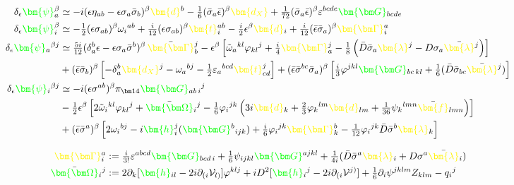 \documentclass[letter,12pt]{article} %
\def\physical#1{ {\color{green} {\bm {#1}} } }
\def\auxiliary#1{ {\color{yellow} {\bm {#1}} } }
\def\grinoXX{ \physical{\psi} }
\def\grinoXY{ \physical{\psi} }
\def\grinoYX{ \physical{\psi} }
\def\grinoYY{ \physical{\psi} }
\def\d{ \auxiliary{d_X} }
\def\dX{ \auxiliary{d} }
\def\dY{ \auxiliary{d} }
\def\dYY{ \auxiliary{d} }
\def\f{\auxiliary{f} }
\def\l{ \auxiliary{\lambda} }
\def\t{ \auxiliary{t} }
\def\X{X}
\def\T{T}
\def\gravitonYY{\physical{h} }
\def\Ga{\auxiliary{\bm \Gamma}}
\def\Oh{\physical{ {\bm \Omega} }}
\def\G{ \physical{ {\bm G} } }
\begin{document}
{%
\begin{align}
\delta_\epsilon \grinoXX_a^\beta &\simeq
	-i  (\epsilon \eta_{ab} - \epsilon \sigma_a \bar \sigma_b)^\beta \dX^b
	-\tfrac 16 (\bar \sigma_a \bar \epsilon)^{\beta} \d
	+\tfrac 1{72} (\bar \sigma_a \bar \epsilon)^{\beta} \varepsilon^{bcde} \G_{bcde}
\cr	
\delta_\epsilon \grinoYX_i^\beta &\simeq
	-\tfrac12 (\epsilon \sigma_{ab})^\beta \omega_i{}^{ab}
	+\tfrac i{12} (\epsilon \sigma_{ab})^\beta \t_i^{ab}
	-\tfrac i2 \epsilon^\beta \dX_i  
	+ \tfrac i{12} (\bar \epsilon \bar \sigma_a )^\beta \Ga_i^{a}
\cr
\delta_\epsilon \grinoXY_{a}{}^{\beta j} 
	&\simeq 
	\tfrac{5i}{12} (\delta_a^b\epsilon 
		- \epsilon \sigma_a \bar \sigma^b)^\beta\,  \bar \Ga_b^j
	- \epsilon^\beta \left[
		\tilde \omega_a{}^{kl}\varphi_{kl}{}^j 
		+\tfrac i4 \Ga^j_a
		-\tfrac18\left(
			\bar D\bar \sigma_a \l^j - D\sigma_a \bar \l^j 
		\right) 
	\right]
	\cr
	& + (\bar \epsilon \bar \sigma_b)^\beta \left[ 
		- \delta_a^b \d^j - \omega_a{}^{bj} 
		-\tfrac12 \varepsilon_a{}^{bcd} \t^j_{cd}
		\right]
	+ (\bar \epsilon \bar \sigma^{bc}\bar \sigma_a)^\beta \left[ 
		\tfrac i3 \varphi^{jkl} \G_{bc\, kl} 
		+\tfrac16 (\bar D \bar \sigma_{bc} \bar\l^j)
		\right]		
\cr
\delta_\epsilon \grinoYY_{i}{}^{\beta j} 
	&\simeq
	-i(\epsilon \sigma^{ab})^\beta \pi_{\bm 14} \G_{ab\,i}{}^j
	\cr
	&-\tfrac 12 \epsilon^\beta \left[
		2\tilde \omega_i{}^{kl}\varphi_{kl}{}^j
		+\bar \Oh_i{}^j
		-\tfrac16 \varphi_i{}^{jk} \left(
			3i \dY_k 
			+\tfrac23 \varphi_k{}^{lm} \dYY_{lm}
			+\tfrac1{36} \psi_k{}^{lmn} \bar \f_{lmn}
		\right)
		\right]
	\cr
	&+ (\bar \epsilon \bar \sigma^a)^\beta \left[
		2\omega_i{}^{bj}  
		-i\gravitonYY_i^j(\G^b{}_{ijk})
		+\tfrac i6 \varphi_i{}^{jk} \Ga_k^b 
		-\tfrac 1{12} \varphi_i{}^{jk} \bar D \bar \sigma^b \l_k
		\right]
\nonumber	
\end{align}


\begin{align}
\Ga^{a}_i 
&:=\tfrac i{3!}\varepsilon^{abcd} \G_{bcd \,i}
	+\tfrac16 \psi_{ijkl} \G^{a jkl} 
	+\tfrac1{4i} ( \bar D \bar \sigma^a \l_i + D \sigma^a \bar \l_i )
\cr
\bar \Oh_i{}^j &:= 2\partial_k [ \gravitonYY_{il} - 2i \partial_{(i}\mathcal V_{l)} ]  \varphi^{kl j} 
 	+iD^2 [  \gravitonYY_i{}^j - 2i \partial_{(i}\mathcal V^{j)} ]
	+\tfrac16\partial_i \psi^{jklm} Z_{klm}
	- q_i{}^j	
\nonumber
\end{align}

}
\end{document}
